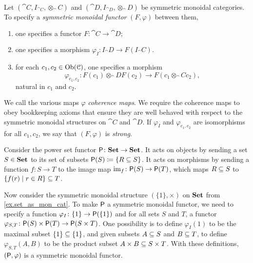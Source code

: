 \documentclass[7Sketches]{subfiles}
\begin{document}
\begin{roughDef}%
%
\label{roughdef.monoidal_functor}
Let $(\cat{C},I_{\cat{C}},\otimes_\cat{C})$ and
$(\cat{D},I_{\cat{D}},\otimes_\cat{D})$ be symmetric monoidal categories. To
specify a \emph{symmetric monoidal functor} $(F,\varphi)$ between them,
\begin{enumerate}[label=(\roman*)]
	\item one specifies a functor $F\colon\cat{C}\to\cat{D}$;
	\item one specifies a morphism $\varphi_I\colon I_\cat{D}\to F(I_\cat{C})$.
	\item for each $c_1,c_2\in\Ob(\cat{C})$, one specifies a morphism 
	\[
	    \varphi_{c_1,c_2}\colon F(c_1)\otimes_\cat{D} F(c_2)\to F(c_1\otimes_\cat{C} c_2),
	  \]
	  natural in $c_1$ and $c_2$.
\end{enumerate}
We call the various maps $\varphi$ \emph{coherence maps}. We require the
coherence maps to obey bookkeeping axioms that ensure they are well behaved with
respect to the symmetric monoidal structures on $\cat{C}$ and
$\cat{D}$.%
 If $\varphi_I$ and $\varphi_{c_1,c_2}$ are isomorphisms for all $c_1,c_2$, we say that $(F,\varphi)$ is \emph{strong}.

\end{roughDef}

\begin{example} %
\label{ex.powset}%
Consider the power set functor $\powset\colon\smset\to\smset$. It acts on objects by sending a set
$S\in\smset$ to its set of subsets $\powset(S)\coloneqq\{R\ss S\}$. It acts on morphisms by sending a function $f\colon
S\to T$ to the image map $\im_f\colon\powset(S)\to\powset(T)$, which maps $R\ss
S$ to $\{f(r)\mid r\in R\}\ss T$.

Now consider the symmetric monoidal structure $(\{1\},\times)$ on $\smset$ from
\cref{ex.set_as_mon_cat}. To make $\powset$ a symmetric monoidal functor, we
need to specify a function $\varphi_I\colon\{1\}\to\powset(\{1\})$ and for all
sets $S$ and $T$, a functor $\varphi_{S,T}\colon \powset(S)\times\powset(T) \to
\powset(S \times T)$. One possibility is to define $\varphi_I(1)$ to be the maximal subset $\{1\}\ss\{1\}$, and
given subsets $A \ss S$ and $B \ss T$, to define $\varphi_{S,T}(A,B)$ to be the product subset $A
\times B \ss S \times T$. With these definitions, $(\powset,\varphi)$ is a symmetric monoidal functor.
\end{example}
\end{document}
